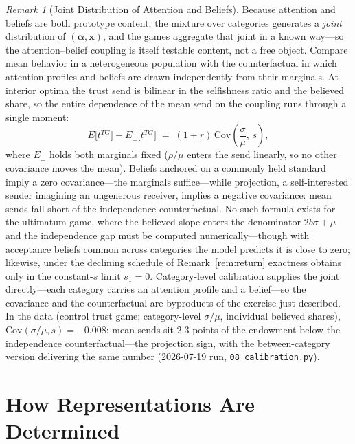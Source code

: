 \documentclass[11pt]{article}
\theoremstyle{plain}
\theoremstyle{remark}
\newtheorem{remark}{Remark}
\begin{document}
\begin{remark}[Joint Distribution of Attention and Beliefs]
\label{rem:joint}
Because attention and beliefs are both prototype content, the mixture over categories generates a \emph{joint} distribution of $(\boldsymbol{\alpha},\mathbf{x})$, and the games aggregate that joint in a known way---so the attention--belief coupling is itself testable content, not a free object. Compare mean behavior in a heterogeneous population with the counterfactual in which attention profiles and beliefs are drawn independently from their marginals. At interior optima the trust send is bilinear in the selfishness ratio and the believed share, so the entire dependence of the mean send on the coupling runs through a single moment:
\begin{equation*}
E\bigl[t^{TG}\bigr]-E_{\perp}\bigl[t^{TG}\bigr]\;=\;(1+r)\,\mathrm{Cov}\!\left(\frac{\sigma}{\mu},\,s\right),
\end{equation*}
where $E_{\perp}$ holds both marginals fixed ($\rho/\mu$ enters the send linearly, so no other covariance moves the mean). Beliefs anchored on a commonly held standard imply a zero covariance---the marginals suffice---while projection, a self-interested sender imagining an ungenerous receiver, implies a negative covariance: mean sends fall short of the independence counterfactual. No such formula exists for the ultimatum game, where the believed slope enters the denominator $2b\sigma+\mu$ and the independence gap must be computed numerically---though with acceptance beliefs common across categories the model predicts it is close to zero; likewise, under the declining schedule of Remark~\ref{rem:return} exactness obtains only in the constant-$s$ limit $s_{1}=0$. Category-level calibration supplies the joint directly---each category carries an attention profile and a belief---so the covariance and the counterfactual are byproducts of the exercise just described. In the data (control trust game; category-level $\sigma/\mu$, individual believed shares), $\mathrm{Cov}(\sigma/\mu,s)=-0.008$: mean sends sit $2.3$ points of the endowment below the independence counterfactual---the projection sign, with the between-category version delivering the same number (2026-07-19 run, \texttt{08\_calibration.py}).
\end{remark}

\section{How Representations Are Determined}
\label{sec:determination}
\end{document}
